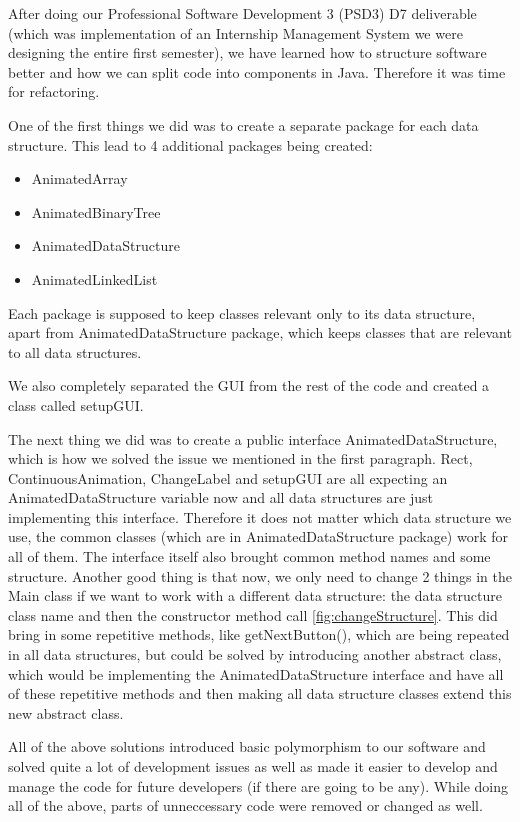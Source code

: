 \documentclass{l3proj}
\begin{document}


After doing our Professional Software Development 3 (PSD3) D7 deliverable (which was implementation of an Internship Management System we were designing the entire first semester), we have learned how to structure software better and how we can split code into components in Java. Therefore it was time for refactoring.

One of the first things we did was to create a separate package for each data structure. This lead to 4 additional packages being created:
\begin{itemize} 
	\item AnimatedArray
	\item AnimatedBinaryTree
	\item AnimatedDataStructure
	\item AnimatedLinkedList
\end{itemize}
Each package is supposed to keep classes relevant only to its data structure, apart from AnimatedDataStructure package, which keeps classes that are relevant to all data structures.

We also completely separated the GUI from the rest of the code and created a class called setupGUI.



The next thing we did was to create a public interface AnimatedDataStructure, which is how we solved the issue we mentioned in the first paragraph. Rect, ContinuousAnimation, ChangeLabel and setupGUI are all expecting an AnimatedDataStructure variable now and all data structures are just implementing this interface. Therefore it does not matter which data structure we use, the common classes (which are in AnimatedDataStructure package) work for all of them. The interface itself also brought common method names and some structure. Another good thing is that now, we only need to change 2 things in the Main class if we want to work with a different data structure: the data structure class name and then the constructor method call \ref{fig:changeStructure}. This did bring in some repetitive methods, like getNextButton(), which are being repeated in all data structures, but could be solved by introducing another abstract class, which would be implementing the AnimatedDataStructure interface and have all of these repetitive methods and then making all data structure classes extend this new abstract class.

All of the above solutions introduced basic polymorphism to our software and solved quite a lot of development issues as well as made it easier to develop and manage the code for future developers (if there are going to be any). While doing all of the above, parts of unneccessary code were removed or changed as well.
\end{document}
